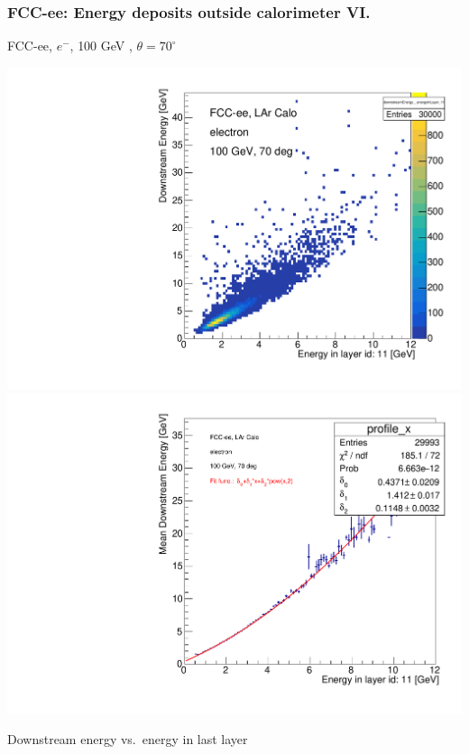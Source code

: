 \documentclass[aspectratio=169]{beamer}
\newcommand{\bluetext}[1]{%
  \textcolor{myBlue}{#1}
}
\newcommand{\redtext}[1]{%
  \textcolor{myRed}{#1}
}
\begin{document}
\begin{frame}
  \frametitle{FCC-ee: Energy deposits outside calorimeter VI.}

  \centering
  FCC-ee, $e^{-}$, \redtext{100 GeV}, \bluetext{$\theta = 70^{\circ}$} \\[1.5ex]
  \begin{adjustwidth}{-5mm}{-5mm}
    \includegraphics[width=0.49\linewidth]{figures/2d/hist_downstream_vs_layer_11_70deg_100GeV.pdf}
    \includegraphics[width=0.49\linewidth]{figures/2d/profile_downstream_vs_layer_11_70deg_100GeV.pdf}
  \end{adjustwidth}
  \redtext{Downstream} energy vs.\ energy in last layer
\end{frame}
\end{document}
